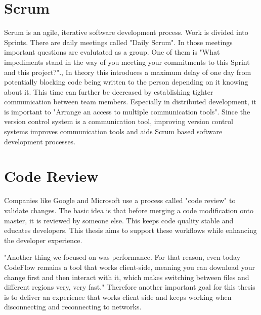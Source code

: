 \section{Scrum}
Scrum is an agile, iterative software development process. Work is divided into Sprints. There are daily meetings called "Daily Scrum". In those meetings important questions are evalutated as a group. One of them is "What impediments stand in the way of you meeting your commitments to this Sprint and this project?".\cite{schwaber2004agile},\cite{10.1007/978-1-4471-0947-1_11}
In theory this introduces a maximum delay of one day from potentially blocking code being written to the person depending on it knowing about it. This time can further be decreased by establishing tighter communication between team members.
Especially in distributed development, it is important to "Arrange an access to multiple communication tools"\cite{5196933}.
Since the version control system is a communication tool, improving version control systems improves communication tools and aids Scrum based software development processes.

\section{Code Review}

Companies like Google and Microsoft use a process called "code review" to validate changes. The basic idea is that before merging a code modification onto master, it is reviewed by someone else. This keeps code quality stable and educates developers.\cite{SadowskiSoederbergChurchSipkoBacchelli:2018:Moderncodereview:acasestudyatgoogle} This thesis aims to support these workflows while enhancing the developer experience. 

"Another thing we focused on was performance. For that
reason, even today CodeFlow remains a tool that works
client-side, meaning you can download your change first
and then interact with it, which makes switching between
files and different regions very, very fast."\cite{CzerwonkaGreilerBirdPanjerCoatta:2018:CodeFlow:ImprovingtheCodeReviewProcessatMicrosoft} Therefore another important goal for this thesis is to deliver an experience that works client side and keeps working when disconnecting and reconnecting to networks.